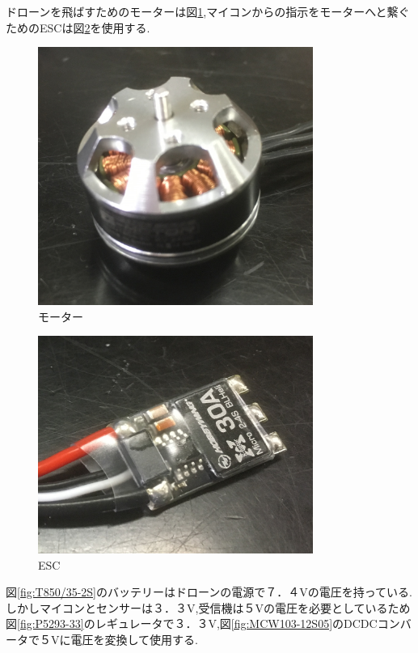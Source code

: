 \documentclass[12pt,oneside]{paper}
\begin{document}
ドローンを飛ばすためのモーターは図\ref{fig:MN1804-KV2400},マイコンからの指示をモーターへと繋ぐためのESCは図\ref{fig:30A Micro 2-4S}を使用する.

\begin{figure}[H]
\begin{center}
\includegraphics[width=90mm]{ga/mot.jpg}
\end{center}
\caption{モーター}
\label{fig:MN1804-KV2400}
\end{figure}

\begin{figure}[H]
\begin{center}
\includegraphics[width=90mm]{ga/esc.jpg}
\end{center}
\caption{ESC}
\label{fig:30A Micro 2-4S}
\end{figure}

図\ref{fig:T850/35-2S}のバッテリーはドローンの電源で７．４Vの電圧を持っている.しかしマイコンとセンサーは３．３V,受信機は５Vの電圧を必要としているため図\ref{fig:P5293-33}のレギュレータで３．３V,図\ref{fig:MCW103-12S05}のDCDCコンバータで５Vに電圧を変換して使用する.
\end{document}
